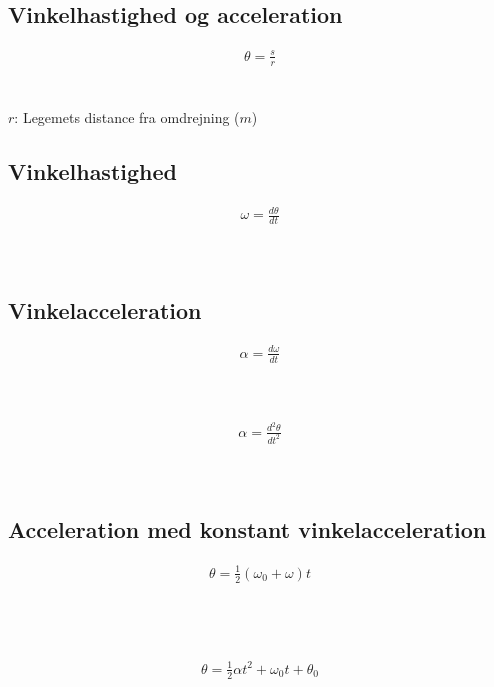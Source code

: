 \subsection{Vinkelhastighed og acceleration}
	\begin{align}
		\theta=\frac{s}{r}
	\end{align}
	\vinkel\\
	\strek\\
	$r$: Legemets distance fra omdrejning ($m$)

	\subsection{Vinkelhastighed}
		\begin{align}
			\omega=\frac{d\theta}{dt}
		\end{align}
		\vinkelhast\\
		\vinkel\\
		\tid

	\subsection{Vinkelacceleration}
		\begin{align}
			\alpha=\frac{d\omega}{dt}
		\end{align}
		\vinkelacceleration\\
		\vinkelhast\\
		\tid

		\begin{align}
			\alpha=\frac{d^2\theta}{dt^2}
		\end{align}
		\vinkelacceleration\\
		\vinkel\\
		\tid

\subsection{Acceleration med konstant vinkelacceleration}
	\begin{align}
		\theta=\frac{1}{2}(\omega_0+\omega)t
	\end{align}
	\vinkel\\
	\vinkelhast\\
	\vinkelhastbeg\\
	\tid
	\newpage

	\begin{align}
		\theta=\frac{1}{2}\alpha t^2+\omega_0 t+\theta_0
	\end{align}
	\vinkel\\
	\vinkelacceleration\\
	\vinkelhast\\
	\vinkelhastbeg\\
	\vinkelbeg\\
	\tid

